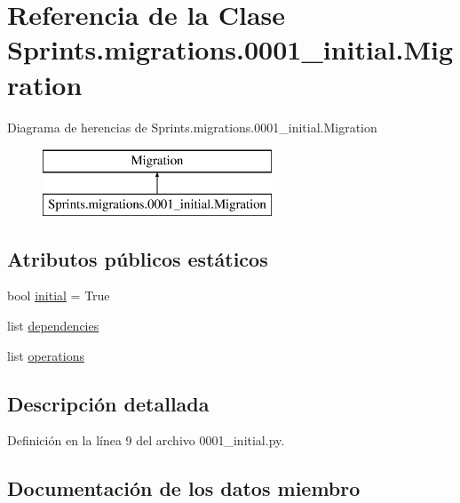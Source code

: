 \hypertarget{class_sprints_1_1migrations_1_10001__initial_1_1_migration}{}\section{Referencia de la Clase Sprints.\+migrations.0001\+\_\+initial.Migration}
\label{class_sprints_1_1migrations_1_10001__initial_1_1_migration}
Diagrama de herencias de Sprints.\+migrations.0001\+\_\+initial.Migration\begin{figure}[H]
\begin{center}
\leavevmode
\includegraphics[height=2.000000cm]{class_sprints_1_1migrations_1_10001__initial_1_1_migration}
\end{center}
\end{figure}
\subsection*{Atributos públicos estáticos}
\begin{DoxyCompactItemize}
\item 
bool \hyperlink{class_sprints_1_1migrations_1_10001__initial_1_1_migration_a6933255dcf8717f6fe79f46a84e3889a}{initial} = True
\item 
list \hyperlink{class_sprints_1_1migrations_1_10001__initial_1_1_migration_a88d3ca1bdd26753226e2336ff0f591cf}{dependencies}
\item 
list \hyperlink{class_sprints_1_1migrations_1_10001__initial_1_1_migration_ab7ef4aab24ce79cb91f7d76fa8efae58}{operations}
\end{DoxyCompactItemize}


\subsection{Descripción detallada}


Definición en la línea 9 del archivo 0001\+\_\+initial.\+py.



\subsection{Documentación de los datos miembro}
